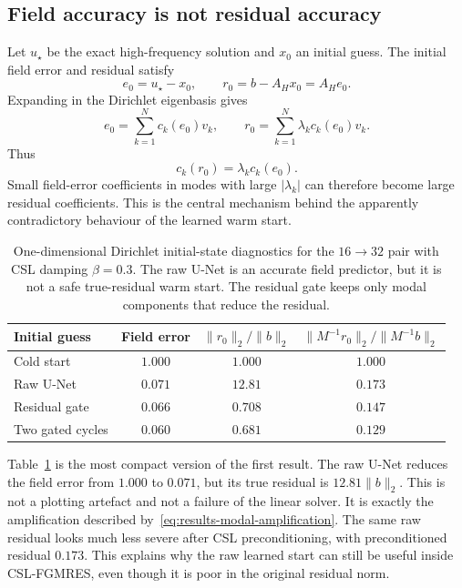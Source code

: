 \subsection{Field accuracy is not residual accuracy}
\label{subsec:results-field-vs-residual}

Let $u_\star$ be the exact high-frequency solution and $x_0$ an initial guess.
The initial field error and residual satisfy
\begin{equation}
    e_0 = u_\star - x_0,
    \qquad
    r_0 = b - A_H x_0 = A_H e_0.
    \label{eq:results-error-residual}
\end{equation}
Expanding in the Dirichlet eigenbasis gives
\begin{equation}
    e_0 = \sum_{k=1}^{N} c_k(e_0)v_k,
    \qquad
    r_0 = \sum_{k=1}^{N} \lambda_k c_k(e_0)v_k.
    \label{eq:results-modal-amplification}
\end{equation}
Thus
\[
    c_k(r_0) = \lambda_k c_k(e_0).
\]
Small field-error coefficients in modes with large $|\lambda_k|$ can therefore
become large residual coefficients. This is the central mechanism behind the
apparently contradictory behaviour of the learned warm start.

\begin{table}[htbp]
\centering
\caption{One-dimensional Dirichlet initial-state diagnostics for the
$16\to32$ pair with CSL damping $\beta=0.3$. The raw U-Net is an accurate field
predictor, but it is not a safe true-residual warm start. The residual gate
keeps only modal components that reduce the residual.}
\label{tab:results-1d-initial-state}
\begin{tabular}{lccc}
\toprule
Initial guess & Field error & $\|r_0\|_2/\|b\|_2$
& $\|M^{-1}r_0\|_2/\|M^{-1}b\|_2$ \\
\midrule
Cold start & $1.000$ & $1.000$ & $1.000$ \\
Raw U-Net & $0.071$ & $12.81$ & $0.173$ \\
Residual gate & $0.066$ & $0.708$ & $0.147$ \\
Two gated cycles & $0.060$ & $0.681$ & $0.129$ \\
\bottomrule
\end{tabular}
\end{table}

Table~\ref{tab:results-1d-initial-state} is the most compact version of the
first result. The raw U-Net reduces the field error from $1.000$ to $0.071$,
but its true residual is $12.81\|b\|_2$. This is not a plotting artefact and
not a failure of the linear solver. It is exactly the amplification described
by~\eqref{eq:results-modal-amplification}. The same raw residual looks much
less severe after CSL preconditioning, with preconditioned residual $0.173$.
This explains why the raw learned start can still be useful inside
CSL-FGMRES, even though it is poor in the original residual norm.

